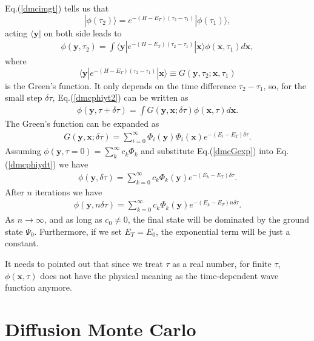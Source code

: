 \documentclass[12pt,letterpaper,UTF8]{report}
\begin{document}
{Eq.(\ref{dmcimgt}) tells us that
\begin{equation}
  | \phi(\tau_2) \rangle = e^{-(H-E_T)(\tau_2-\tau_1)} | \phi(\tau_1) \rangle,
\end{equation}
acting $\langle \bm{y} |$ on both side leads to
\begin{eqnarray}
\phi(\bm{y},\tau_2) = \int \langle \bm{y} | e^{-(H-E_T)(\tau_2-\tau_1)} | \bm{x} \rangle  \phi(\bm{x},\tau_1)  d\bm{x}, \label{dmcphiyt2}
\end{eqnarray}
where
\begin{equation}
  \langle \bm{y} | e^{-(H-E_T)(\tau_2-\tau_1)} | \bm{x} \rangle \equiv G(\bm{y},\tau_2; \bm{x}, \tau_1)
\end{equation}
is the Green's function.
It only depends on the time difference $\tau_2-\tau_1$, so, for the small step $\delta \tau$, Eq.(\ref{dmcphiyt2}) can be written as
\begin{eqnarray}
\phi(\bm{y},\tau + \delta \tau) = \int G(\bm{y},\bm{x}; \delta \tau) \phi(\bm{x},\tau) d\bm{x}. \label{dmcphiydt}
\end{eqnarray}
The Green's function can be expanded as
\begin{eqnarray}
 G(\bm{y},\bm{x}; \delta \tau) = \sum_{i=0}^{\infty} \Phi_i(\bm{y})\Phi_i(\bm{x}) e^{-(E_i-E_T)\delta \tau}. \label{dmcGexp}
\end{eqnarray}
Assuming $\phi(\bm{y},\tau=0)=\sum_{k}^{\infty} c_k \Phi_k$ and substitute Eq.(\ref{dmcGexp}) into Eq.(\ref{dmcphiydt}) we have
\begin{eqnarray}
\phi(\bm{y},\delta \tau) = \sum_{k=0}^{\infty} c_k \Phi_k(\bm{y}) e^{-(E_k-E_T)\delta \tau}   . \label{dmcphiydt2}
\end{eqnarray}
After $n$ iterations we have
\begin{eqnarray}
\phi(\bm{y}, n \delta \tau) = \sum_{k=0}^{\infty} c_k \Phi_k(\bm{y}) e^{-(E_k-E_T) n \delta \tau}  . \label{dmcphiydtn}
\end{eqnarray}
As $n \rightarrow \infty$, and as long as $c_0 \neq 0$, the final state will be dominated by the ground state $\Psi_0$. Furthermore, if we set $E_T=E_0$, the exponential term will be just a constant.

It needs to pointed out that since we treat $\tau$ as a real number, for finite $\tau$, $\phi(\bm{x}, \tau)$ does not have the physical meaning as the time-dependent wave function anymore.

\section{Diffusion Monte Carlo} \label{subsecDMC}

}
\end{document}
